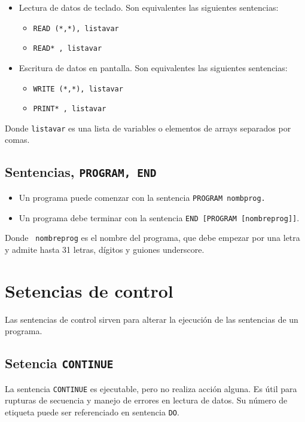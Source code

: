 \begin{itemize}
	\item Lectura de datos de teclado. Son equivalentes las siguientes sentencias:
	      \begin{itemize}
		      \item {\tt READ (*,*), listavar}
		      \item {\tt READ* , listavar}
	      \end{itemize}

	\item Escritura de datos en pantalla. Son equivalentes las siguientes sentencias:
	      \begin{itemize}
		      \item {\tt WRITE (*,*), listavar}
		      \item {\tt PRINT* , listavar}
	      \end{itemize}
\end{itemize}
Donde {\tt listavar} es una lista de variables o elementos de arrays separados por comas.

\subsection{Sentencias, {\tt PROGRAM, END}}

\begin{itemize}
	\item Un programa puede comenzar con la sentencia {\tt PROGRAM nombprog.}
	\item Un programa debe terminar con la sentencia {\tt END  [PROGRAM [nombreprog]]}.
\end{itemize}
Donde \texttt{ nombreprog} es el nombre del programa, que debe empezar por una letra y admite hasta 31 letras, dígitos y guiones underscore.

\section{Setencias de control}

Las sentencias de control sirven para alterar la ejecución de las sentencias de un programa.



\subsection{Setencia {\tt CONTINUE}}

La sentencia \texttt{CONTINUE} es ejecutable, pero no realiza acción alguna. Es útil para rupturas de secuencia y manejo de errores en lectura de datos. Su número de etiqueta puede ser referenciado en sentencia \texttt{DO}.

